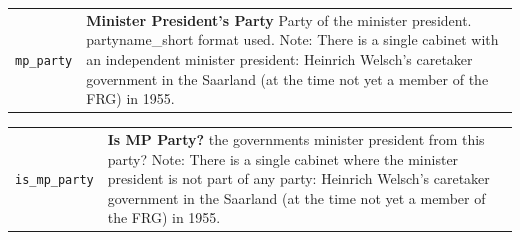 \documentclass[
]{article}
\begin{document}
\begin{longtable}{p{3.2cm}| p{11cm}}
\texttt{mp\_party} &\textbf{Minister President's Party}\newline 
Party of the minister president. partyname\_short format used. Note: There is a single cabinet with an independent minister president: Heinrich Welsch's caretaker government in the Saarland (at the time not yet a member of the FRG) in 1955.
\end{longtable}

\begin{longtable}{p{3.2cm}| p{11cm}}
\texttt{is\_mp\_party} &\textbf{Is MP Party?}\newline 
 the governments minister president from this party? Note: There is a single cabinet where the minister president is not part of any party: Heinrich Welsch's caretaker government in the Saarland (at the time not yet a member of the FRG) in 1955.
\end{longtable}
\end{document}
